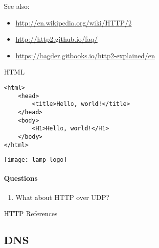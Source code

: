 See also:
\begin{itemize}
\item \url{http://en.wikipedia.org/wiki/HTTP/2}
\item \url{http://http2.github.io/faq/}
\item \url{https://bagder.gitbooks.io/http2-explained/en}
\end{itemize}

\begin{frame}[fragile]{HTML}
  \begin{verbatim}
<html>
    <head>
        <title>Hello, world!</title>
    </head>
    <body>
        <H1>Hello, world!</H1>
    </body>
</html>
  \end{verbatim}
\end{frame}

\begin{frame}{\texttt{[image: lamp-logo]}}
  \centering
  \mode<beamer>{ \texttt{[image: lamp]} }%
\end{frame}

\paragraph{Questions}

  \begin{enumerate}
  \item What about HTTP over UDP?
  \end{enumerate}

\begin{frame}[allowframebreaks]{HTTP References}
  \begin{refsection}
    \nocite{wiki:http, wiki:httptwo, wiki:cookie, wiki:stateless, wiki:html, wiki:lamp,
      rfc2616, rfc7540, rfc7541}
    \printbibliography[heading=none]
  \end{refsection}
\end{frame}

\subsection{DNS}

